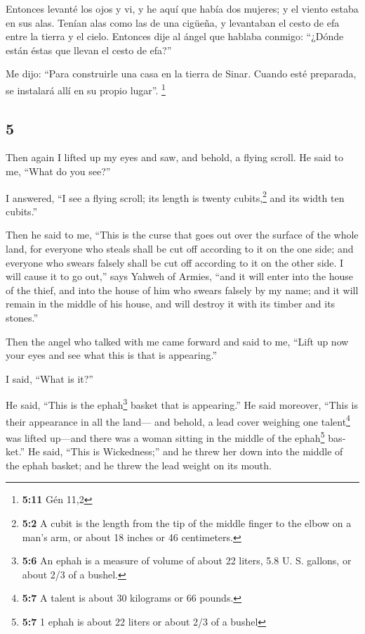 \begin{paracol}{2}
 Entonces levanté los ojos y vi, y he aquí que había dos
mujeres; y el viento estaba en sus alas. Tenían alas como las de una
cigüeña, y levantaban el cesto de efa entre la tierra y el cielo.
 Entonces dije al ángel que hablaba conmigo: ``¿Dónde
están éstas que llevan el cesto de efa?''

 Me dijo: ``Para construirle una casa en la tierra de
Sinar. Cuando esté preparada, se instalará allí en su propio lugar''.
\footnote{\textbf{5:11} Gén 11,2}

\switchcolumn
\begin{otherlanguage}{english}

\hypertarget{section-9}{%
\section{5}\label{section-9}}

 Then again I lifted up my eyes and saw, and behold, a
flying scroll.  He said to me, ``What do you see?''

I answered, ``I see a flying scroll; its length is twenty
cubits,\footnote{\textbf{5:2} A cubit is the length from the tip of the
  middle finger to the elbow on a man's arm, or about 18 inches or 46
  centimeters.} and its width ten cubits.''

 Then he said to me, ``This is the curse that goes out
over the surface of the whole land, for everyone who steals shall be cut
off according to it on the one side; and everyone who swears falsely
shall be cut off according to it on the other side.  I
will cause it to go out,'' says Yahweh of Armies, ``and it will enter
into the house of the thief, and into the house of him who swears
falsely by my name; and it will remain in the middle of his house, and
will destroy it with its timber and its stones.''

 Then the angel who talked with me came forward and said
to me, ``Lift up now your eyes and see what this is that is appearing.''

 I said, ``What is it?''

He said, ``This is the ephah\footnote{\textbf{5:6} An ephah is a measure
  of volume of about 22 liters, 5.8 U. S. gallons, or about 2/3 of a
  bushel.} basket that is appearing.'' He said moreover, ``This is their
appearance in all the land---  and behold, a lead cover
weighing one talent\footnote{\textbf{5:7} A talent is about 30 kilograms
  or 66 pounds.} was lifted up---and there was a woman sitting in the
middle of the ephah\footnote{\textbf{5:7} 1 ephah is about 22 liters or
  about 2/3 of a bushel} basket.''  He said, ``This is
Wickedness;'' and he threw her down into the middle of the ephah basket;
and he threw the lead weight on its mouth.


\end{otherlanguage}
\end{paracol}
